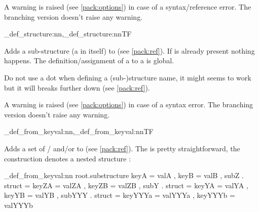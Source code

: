 \documentclass[10pt]{article}
\begin{document}
\begin{tsremark}
A warning is raised (see \ref{pack:options}) in case of a  syntax/reference error. The branching version doesn't raise any warning.
\end{tsremark}

\begin{codedescribe}{\starray_def_structure:nn,\starray_def_structure:nnTF}
\begin{codesyntax}%
\end{codesyntax}
Adds a sub-structure (a  in itself) to  (see \ref{pack:ref}). If  is already present nothing happens. The definition/assignment of a  to a  is global.
\end{codedescribe}


\begin{tsremark}
Do not use a dot when defining a (sub-)structure name, it might seems to work but it will breaks further down (see \ref{pack:ref}).
\end{tsremark}


\begin{tsremark}[Note 2:]
A warning is raised (see \ref{pack:options}) in case of a  syntax error. The branching version doesn't raise any warning.
\end{tsremark}

\begin{codedescribe}{\starray_def_from_keyval:nn,\starray_def_from_keyval:nnTF}
\begin{codesyntax}%
\end{codesyntax}

Adds a set of  /  and/or  to  (see \ref{pack:ref}). The  is pretty straightforward, 
the construction  denotes a nested structure :
\end{codedescribe}

\begin{codestore}
\starray_def_from_keyval:nn {root.substructure} 
  {
    keyA = valA ,
    keyB = valB ,
    subZ . struct = 
      {
        keyZA = valZA ,
        keyZB = valZB ,
      }
    subY . struct =
      {
        keyYA = valYA ,
        keyYB = valYB ,
        subYYY . struct =
          {
            keyYYYa = valYYYa ,
            keyYYYb = valYYYb 
          }
      }
  }
\end{codestore}
\end{document}
